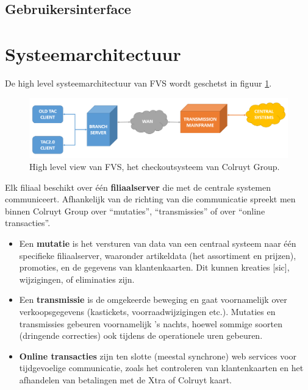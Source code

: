 \subsection{Gebruikersinterface}


\section{Systeemarchitectuur}

De high level systeemarchitectuur van FVS wordt geschetst in figuur \ref{fig:FVSHighLevel}.

\begin{figure}[h!]
    \centering
    \includegraphics[scale=0.35]{img/func-omsch/DiagramHighLevel.PNG}
    \caption{High level view van FVS, het checkoutsysteem van Colruyt Group.}
    \label{fig:FVSHighLevel}
\end{figure}

Elk filiaal beschikt over één \textbf{filiaalserver} die met de centrale systemen communiceert. Afhankelijk van de richting van die communicatie spreekt men binnen Colruyt Group over ``mutaties'', ``transmissies'' of over ``online transacties''.

\begin{itemize}
    \item Een \textbf{mutatie} is het versturen van data van een centraal systeem naar één specifieke filiaalserver, waaronder artikeldata (het assortiment en prijzen), promoties, en de gegevens van klantenkaarten. Dit kunnen kreaties [sic], wijzigingen, of eliminaties zijn.
    \item Een \textbf{transmissie} is de omgekeerde beweging en gaat voornamelijk over verkoopsgegevens (kastickets, voorraadwijzigingen etc.). Mutaties en transmissies gebeuren voornamelijk 's nachts, hoewel sommige soorten (dringende correcties) ook tijdens de operationele uren gebeuren.
    \item \textbf{Online transacties} zijn ten slotte (meestal synchrone) web services voor tijdgevoelige communicatie, zoals het controleren van klantenkaarten en het afhandelen van betalingen met de Xtra of Colruyt kaart.
\end{itemize}

